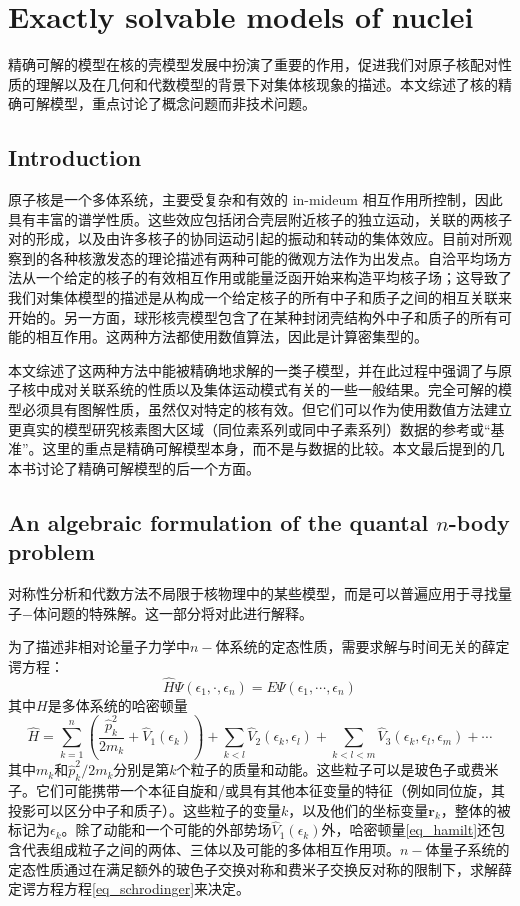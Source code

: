 \chapter{Exactly solvable models of nuclei}
精确可解的模型在核的壳模型发展中扮演了重要的作用，促进我们对原子核配对性质的理解以及在几何和代数模型的背景下对集体核现象的描述。本文综述了核的精确可解模型，重点讨论了概念问题而非技术问题。
\section{Introduction}
原子核是一个多体系统，主要受复杂和有效的 in-mideum 相互作用所控制，因此具有丰富的谱学性质。这些效应包括闭合壳层附近核子的独立运动，关联的两核子对的形成，以及由许多核子的协同运动引起的振动和转动的集体效应。目前对所观察到的各种核激发态的理论描述有两种可能的微观方法作为出发点。自洽平均场方法从一个给定的核子的有效相互作用或能量泛函开始来构造平均核子场；这导致了我们对集体模型的描述是从构成一个给定核子的所有中子和质子之间的相互关联来开始的。另一方面，球形核壳模型包含了在某种封闭壳结构外中子和质子的所有可能的相互作用。这两种方法都使用数值算法，因此是计算密集型的。

本文综述了这两种方法中能被精确地求解的一类子模型，并在此过程中强调了与原子核中成对关联系统的性质以及集体运动模式有关的一些一般结果。完全可解的模型必须具有图解性质，虽然仅对特定的核有效。但它们可以作为使用数值方法建立更真实的模型研究核素图大区域（同位素系列或同中子素系列）数据的参考或“基准”。这里的重点是精确可解模型本身，而不是与数据的比较。本文最后提到的几本书讨论了精确可解模型的后一个方面。

\section{An algebraic formulation of the quantal $n$-body problem}
对称性分析和代数方法不局限于核物理中的某些模型，而是可以普遍应用于寻找量子$-$体问题的特殊解。这一部分将对此进行解释。

为了描述非相对论量子力学中$n-$体系统的定态性质，需要求解与时间无关的薛定谔方程：
\begin{equation}\label{eq_schrodinger}
\widehat{H}\Psi(\epsilon_1,\cdot,\epsilon_n)=E\Psi(\epsilon_1,\cdots,\epsilon_n)
\end{equation}
其中$H$是多体系统的哈密顿量
\begin{equation}\label{eq_hamilt}
\widehat{H}=\sum_{k=1}^n\left(\frac{\widehat{p}^2_k}{2m_k}+\widehat{V}_1(\epsilon_k)\right)+\sum_{k<l}\widehat{V}_2(\epsilon_k,\epsilon_l)+\sum_{k<l<m}\widehat{V}_3(\epsilon_k,\epsilon_l,\epsilon_m)+\cdots
\end{equation}
其中$m_k$和$\widehat{p}_k^2/2m_k$分别是第$k$个粒子的质量和动能。这些粒子可以是玻色子或费米子。它们可能携带一个本征自旋和/或具有其他本征变量的特征（例如同位旋，其投影可以区分中子和质子）。这些粒子的变量$k$，以及他们的坐标变量$\bm{r}_k$，整体的被标记为$\epsilon_k$。除了动能和一个可能的外部势场$\widehat{V}_1(\epsilon_k)$外，哈密顿量\ref{eq_hamilt}还包含代表组成粒子之间的两体、三体以及可能的多体相互作用项。$n-$体量子系统的定态性质通过在满足额外的玻色子交换对称和费米子交换反对称的限制下，求解薛定谔方程方程\ref{eq_schrodinger}来决定。

